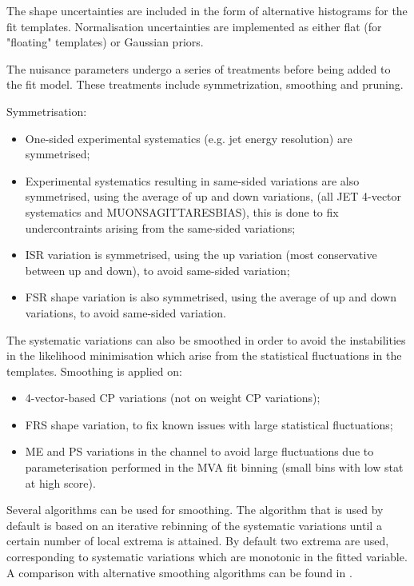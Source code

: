 The shape uncertainties are included in the form of alternative histograms for the fit templates. Normalisation uncertainties are implemented as either flat (for "floating" templates) or Gaussian priors.

The nuisance parameters undergo a series of treatments before being added to the fit model. These treatments include symmetrization, smoothing and pruning.

Symmetrisation:

\begin{itemize}
\item One-sided experimental systematics (e.g. jet energy resolution) are symmetrised;
\item Experimental systematics resulting in same-sided variations are also symmetrised, using the average of up and down variations, (all JET 4-vector systematics and MUON\textunderscore SAGITTA\textunderscore RESBIAS), this is done to fix undercontraints arising from the same-sided variations;
\item \ttbar ISR variation is symmetrised, using the up variation (most conservative between up and down), to avoid same-sided variation;
\item \ttbar FSR shape variation is also symmetrised, using the average of up and down variations, to avoid same-sided variation.
\end{itemize}


The systematic variations can also be smoothed in order to avoid the instabilities in the likelihood minimisation which arise from the statistical fluctuations in the templates. Smoothing is applied on:

\begin{itemize}
\item  4-vector-based CP variations (not on weight CP variations);
\item \ttbar FRS shape variation, to fix known issues with large statistical fluctuations;
\item \ttbar ME and PS variations in the \lephad channel to avoid large fluctuations due to parameterisation performed in the MVA fit binning (small bins with low stat at high score).
\end{itemize}


Several algorithms can be used for smoothing. The algorithm that is used by default is based on an iterative rebinning of the systematic variations until a certain number of local extrema is attained. By default two extrema are used, corresponding to systematic variations which are monotonic in the fitted variable. A comparison with alternative smoothing algorithms can be found in .

